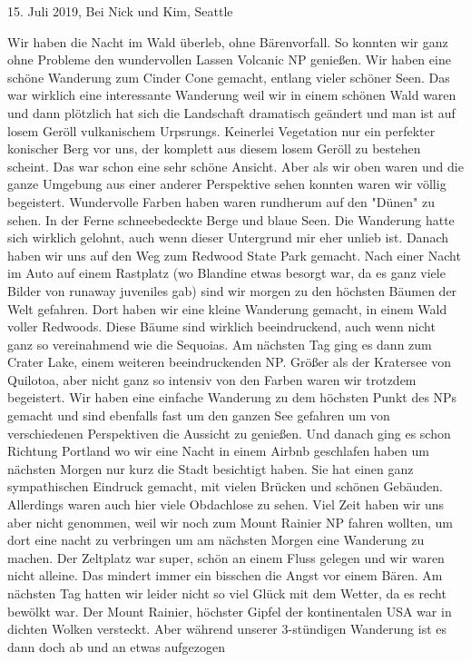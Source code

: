 \documentclass[11pt]{book}
\begin{document}
15. Juli 2019, Bei Nick und Kim, Seattle 

Wir haben die Nacht im Wald überleb, ohne Bärenvorfall. So konnten wir ganz ohne Probleme den wundervollen Lassen Volcanic NP genießen. Wir haben eine 
schöne Wanderung zum Cinder Cone gemacht, entlang vieler schöner Seen. Das war wirklich eine interessante Wanderung weil wir in einem schönen Wald waren 
und dann plötzlich hat sich die Landschaft dramatisch geändert und man ist auf losem Geröll vulkanischem Urpsrungs. Keinerlei Vegetation nur ein perfekter 
konischer Berg vor uns, der komplett aus diesem losem Geröll zu bestehen scheint. Das war schon eine sehr schöne Ansicht. Aber als wir oben waren und die ganze 
Umgebung aus einer anderer Perspektive sehen konnten waren wir völlig begeistert. Wundervolle Farben haben waren rundherum auf den "Dünen" zu sehen. In der Ferne 
schneebedeckte Berge und blaue Seen. Die Wanderung hatte sich wirklich gelohnt, auch wenn dieser Untergrund mir eher unlieb ist. 
Danach haben wir uns auf den Weg zum Redwood State Park gemacht. Nach einer Nacht im Auto auf einem Rastplatz (wo Blandine etwas besorgt war, da es 
ganz viele Bilder von runaway juveniles gab) sind wir morgen zu den höchsten Bäumen der Welt gefahren. Dort haben wir eine kleine Wanderung gemacht, in einem 
Wald voller Redwoods. Diese Bäume sind wirklich beeindruckend, auch wenn nicht ganz so vereinahmend wie die Sequoias. Am nächsten Tag ging es dann zum 
Crater Lake, einem weiteren beeindruckenden NP. Größer als der Kratersee von Quilotoa, aber nicht ganz so intensiv von den Farben waren wir trotzdem 
begeistert. Wir haben eine einfache Wanderung zu dem höchsten Punkt des NPs gemacht und sind ebenfalls fast um den ganzen See gefahren um von verschiedenen 
Perspektiven die Aussicht zu genießen. Und danach ging es schon Richtung Portland wo wir eine Nacht in einem Airbnb geschlafen haben um nächsten Morgen 
nur kurz die Stadt besichtigt haben. Sie hat einen ganz sympathischen Eindruck gemacht, mit vielen Brücken und schönen Gebäuden. Allerdings waren auch 
hier viele Obdachlose zu sehen. Viel Zeit haben wir uns aber nicht genommen, weil wir noch zum Mount Rainier NP fahren wollten, um dort eine nacht zu verbringen 
um am nächsten Morgen eine Wanderung zu machen. Der Zeltplatz war super, schön an einem Fluss gelegen und wir waren nicht alleine. Das mindert immer ein 
bisschen die Angst vor einem Bären. Am nächsten Tag hatten wir leider nicht so viel Glück mit dem Wetter, da es recht bewölkt war. Der Mount Rainier, 
höchster Gipfel der kontinentalen USA war in dichten Wolken versteckt. Aber während unserer 3-stündigen Wanderung ist es dann doch ab und an etwas aufgezogen 
\end{document}
